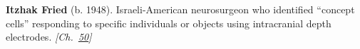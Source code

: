 \textbf{Itzhak Fried} (b. 1948). Israeli-American neurosurgeon who identified ``concept cells'' responding to specific individuals or objects using intracranial depth electrodes. \emph{[Ch.~\hyperref[ch:consciousness]{50}]}

